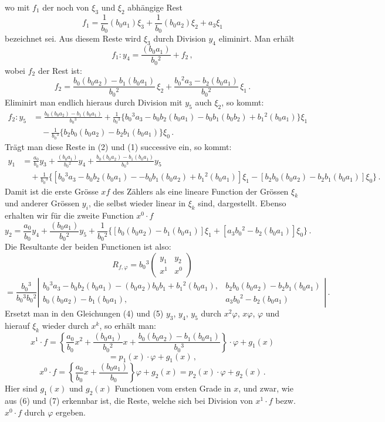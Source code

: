 \documentclass[11pt]{article}
\providecommand{\weq}[2]{\begin{equation}\tag{#1}#2\end{equation}}
\begin{document}
wo mit $f_1$ der noch von $\xi_3$ und $\xi_2$ abhängige Rest
\[ f_1 = \frac{1}{b_0}(b_0a_1)\xi_3 + \frac{1}{b_0}(b_0a_2)\xi_2 + a_3\xi_1 \]
bezeichnet sei. Aus diesem Reste wird $\xi_3$ durch Division $y_4$ eliminirt. Man erhält
\weq{2}{f_1 : y_4 = \frac{(b_0a_1)}{b_0{}^2} + f_2\,,}
wobei $f_2$ der Rest ist:
\[ f_2 = \frac{b_0(b_0a_2) - b_1(b_0a_1)}{b_0{}^2}\,\xi_2 + \frac{b_0{}^2a_3 - b_2(b_0a_1)}{b_0{}^2}\,\xi_1\,. \]
Eliminirt man endlich hieraus durch Division mit $y_5$ auch $\xi_2$, so kommt:
\weq{3}{\begin{aligned}
f_2:y_5 &= \frac{b_0(b_0a_2)-b_1(b_0a_1)}{b_0{}^3} + \frac{1}{b_0{}^3}\{b_0{}^3a_3-b_0b_2(b_0a_1)-b_0b_1(b_0b_2)+b_1{}^2(b_0a_1)\}\xi_1\\
&\quad -\frac{1}{b_0{}^3}\{b_2b_0(b_0a_2)-b_2b_1(b_0a_1)\}\xi_0\,.
\end{aligned}}
Trägt man diese Reste in (2) und (1) successive ein, so kommt:
\weq{4}{\begin{aligned}
y_1 &= \frac{a_0}{b_0}y_3 + \frac{(b_0a_1)}{b_0{}^2}y_4 + \frac{b_0(b_0a_2)-b_1(b_0a_1)}{b_0{}^3}y_5\\
&\quad +\frac{1}{b_0{}^3}\Big\{[b_0{}^3a_3-b_0b_2(b_0a_1)--b_0b_1(b_0a_2)+b_1{}^2(b_0a_1)]\xi_1-[b_2b_0(b_0a_2)-b_2b_1(b_0a_1)]\xi_0\Big\}\,.
\end{aligned}} %
Damit ist die erste Grösse $xf$ des Zählers als eine lineare Function der Grössen $\xi_k$ und anderer Grössen $y_i$, die selbst wieder linear in $\xi_k$ sind, dargestellt. Ebenso erhalten wir für die zweite Function $x^0\cdot f$
\weq{5}{y_2 = \frac{a_0}{b_0}y_4+\frac{(b_0a_1)}{b_0{}^2}y_5+\frac{1}{b_0{}^2}\Big\{[b_0(b_0a_2)-b_1(b_0a_1)]\xi_1+[a_3b_0{}^2-b_2(b_0a_1)]\xi_0\Big\}\,.}
Die Resultante der beiden Functionen ist also:
\[ R_{f,\varphi} = b_0{}^3 \begin{pmatrix} y_1 & y_2 \\ x^1 & x^0 \end{pmatrix} \]
\[ = \frac{b_0{}^3}{b_0{}^3b_0{}^2}\left|\begin{matrix}
b_0{}^3a_3-b_0b_2(b_0a_1)-(b_0a_2)b_0b_1+b_1{}^2(b_0a_1), & b_2b_0(b_0a_2)-b_2b_1(b_0a_1)\\[4pt]
b_0(b_0a_2)-b_1(b_0a_1), & a_3b_0{}^2-b_2(b_0a_1)
\end{matrix}\right|\,. \]
Ersetzt man in den Gleichungen (4) und (5) $y_3$, $y_4$, $y_5$ durch $x^2\varphi$, $x\varphi$, $\varphi$ und hierauf $\xi_k$ wieder durch $x^k$, so erhält man:
\weq{6}{x^1\cdot f = \left\{\frac{a_0}{b_0}x^2+\frac{(b_0a_1)}{b_0{}^2}x+\frac{b_0(b_0a_2)-b_1(b_0a_1)}{b_0{}^3}\right\}\cdot\varphi+g_1(x)}
\[ = p_1(x)\cdot\varphi + g_1(x)\,, \]
\weq{7}{x^0\cdot f = \left\{\frac{a_0}{b_0}x+\frac{(b_0a_1)}{b_0}\right\}\varphi+g_2(x) = p_2(x)\cdot\varphi+g_2(x)\,.}
Hier sind $g_1(x)$ und $g_2(x)$ Functionen vom ersten Grade in $x$, und zwar, wie aus (6) und (7) erkennbar ist, die Reste, welche sich bei Division von $x^1\cdot f$ bezw. $x^0\cdot f$ durch $\varphi$ ergeben.
\end{document}
